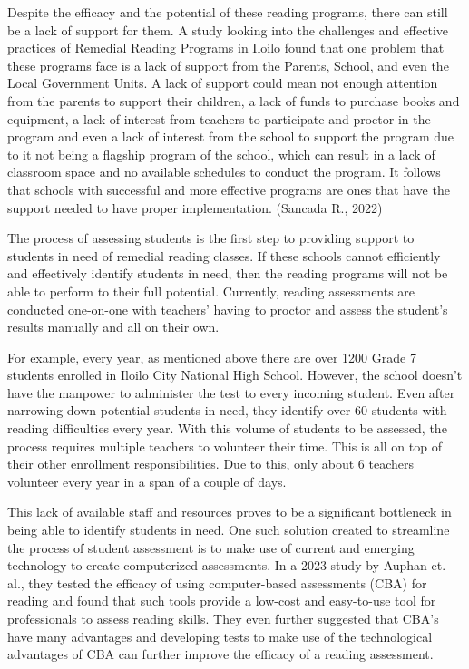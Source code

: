 Despite the efficacy and the potential of these reading programs, there can still be a lack of support for them. A study looking into the challenges and effective practices of Remedial Reading Programs in Iloilo found that one problem that these programs face is a lack of support from the Parents, School, and even the Local Government Units. A lack of support could mean not enough attention from the parents to support their children, a lack of funds to purchase books and equipment, a lack of interest from teachers to participate and proctor in the program and even a lack of interest from the school to support the program due to it not being a flagship program of the school, which can result in a lack of classroom space and no available schedules to conduct the program. It follows that schools with successful and more effective programs are ones that have the support needed to have proper implementation. (Sancada R., 2022)

The process of assessing students is the first step to providing support to students in need of remedial reading classes. If these schools cannot efficiently and effectively identify students in need, then the reading programs will not be able to perform to their full potential. Currently, reading assessments are conducted one-on-one with teachers’ having to proctor and assess the student’s results manually and all on their own.

For example, every year, as mentioned above there are over 1200 Grade 7 students enrolled in Iloilo City National High School. However, the school doesn’t have the manpower to administer the test to every incoming student. Even after narrowing down potential students in need, they identify over 60 students with reading difficulties every year. With this volume of students to be assessed, the process requires multiple teachers to volunteer their time. This is all on top of their other enrollment responsibilities. Due to this, only about 6 teachers volunteer every year in a span of a couple of days.

This lack of available staff and resources proves to be a significant bottleneck in being able to identify students in need. One such solution created to streamline the process of student assessment is to make use of current and emerging technology to create computerized assessments. In a 2023 study by Auphan et. al., they tested the efficacy of using computer-based assessments (CBA) for reading and found that such tools provide a low-cost and easy-to-use tool for professionals to assess reading skills. They even further suggested that CBA’s have many advantages and developing tests to make use of the technological advantages of CBA can further improve the efficacy of a reading assessment.\nocite{Auphan_Ecalle_Magnan_2020}

